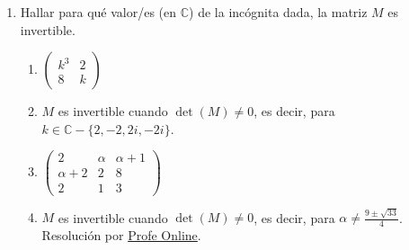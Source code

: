 \documentclass[a4paper]{article}
\newcommand{\answer}{\item[**]}
\newcommand{\exercise}{\item}
\begin{document}
\begin{enumerate}
\begin{multicols}{2}
\begin{enumerate} [label=(\alph*)]
		\item $\begin{vmatrix} 4 & 2x-2 & 0 \\ 3 & 5 & 1 \\ 1 & 4 & x\end{vmatrix}=14$
		\answer $x=2$ o $x=\frac{8}{3}$. Resolución por \href{https://youtu.be/mjS7OMrtNd8}{Mate Profesor Rosado}

		\item $\begin{vmatrix} 2 & x & x+1 \\ x+2 & 2 & 8 \\ 2 & 1 & 3\end{vmatrix}=0$
		\answer $x=\displaystyle\frac{9\pm\sqrt{33}}{4}$. Resolución por \href{https://youtu.be/nJRWcW-m7UU}{Profe Online}

		\item $\begin{vmatrix} 1-\lambda & -1 & 0 \\ -1 & 2-\lambda & -1 \\ 0 & -1 & 1-\lambda\end{vmatrix}=0$
		\answer $\lambda=0$, $\lambda=1$ o $\lambda=2$. Resolución por \href{https://youtu.be/YCZd_BWyE0o}{Matemático Compulsivo}

	\end{enumerate}
	\end{multicols}

	\exercise Hallar para qué valor/es (en $\mathbb{C}$) de la incógnita dada, la matriz $M$ es invertible.
	\begin{multicols}{2}
	\begin{enumerate} [label=(\alph*)]

		\item $\begin{pmatrix} k^3 & 2 \\ 8 & k \end{pmatrix}$
		\answer $M$ es invertible cuando $\det(M)\neq0$, es decir, para $k\in\mathbb{C}-\{2,-2,2i,-2i\}$.

		\item $\begin{pmatrix} 2 & \alpha & \alpha+1 \\ \alpha+2 & 2 & 8 \\ 2 & 1 & 3\end{pmatrix}$
		\answer $M$ es invertible cuando $\det(M)\neq0$, es decir, para $\alpha\neq\displaystyle\frac{9\pm\sqrt{33}}{4}$. Resolución por \href{https://youtu.be/nJRWcW-m7UU}{Profe Online}.


\end{enumerate}
\end{multicols}
\end{enumerate}
\end{document}
